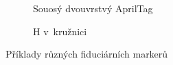 \begin{figure}
\begin{subfigure}[t]{0.2\textwidth}
          \caption{Souosý dvouvrstvý AprilTag}
          \label{fig:customAprilTag}
        \end{subfigure}
        \hfill
        \begin{subfigure}[t]{0.2\textwidth}
          \centering
          \caption{H v~kružnici}
          \label{fig:H}
        \end{subfigure}
        \caption{Příklady různých fiduciárních markerů}
        \label{fig:markery}
      \end{figure}
      